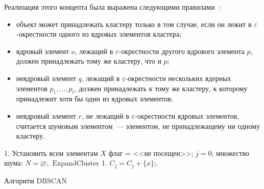 Реализация этого концепта была выражена следующими правилами~\cite{cod}:
\begin{itemize}
    \item объект может принадлежать кластеру только в том случае, если он лежит в \( \varepsilon \)-окрестности одного из ядровых элементов кластера;
    \item ядровый элемент \( o \), лежащий в \( \varepsilon \)-окрестности другого ядрового элемента \( p \), должен принадлежать тому же кластеру, что и \( p \);
    \item неядровый элемент \( q \), лежащий в \( \varepsilon \)-окрестности нескольких ядерных элементов \( p_1, \ldots, p_i \), должен принадлежать к тому же кластеру, к которому принадлежит хотя бы один из ядровых элементов;
    \item неядровый элемент \( r \), не лежащий в \( \varepsilon \)-окрестности ядровых элементов, считается шумовым элементом~--- элементом, не принадлежащему ни одному кластеру.
\end{itemize}

\begin{algorithm}[t!]
    \DontPrintSemicolon
    1. Установить всем элементам \( X \) флаг = <<не посещен>>; \( j = 0 \); множество шума: \( N = \varnothing \);. 
    \BlankLine
    \( \mathrm{ExpandCluster} \)\;
    1. \( C_j = C_j + \{x\} \);. 
    \caption{Алгоритм DBSCAN}
    \label{alg:dbscan}
\end{algorithm}

